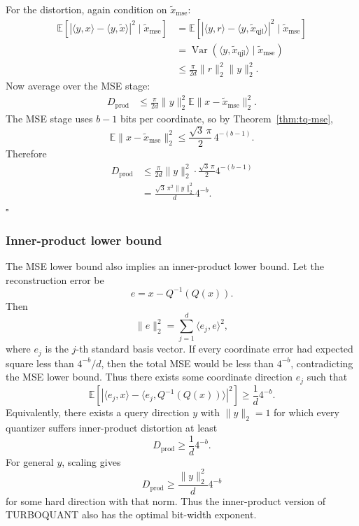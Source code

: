 For the distortion, again condition on $\widetilde x_{\mathrm{mse}}$:
\begin{align}
    \mathbb E\left[|\langle y,x\rangle-\langle y,\widetilde x\rangle|^2
    \mid \widetilde x_{\mathrm{mse}}\right]
    &=\mathbb E\left[|\langle y,r\rangle-\langle y,\widetilde x_{\mathrm{qjl}}\rangle|^2
    \mid \widetilde x_{\mathrm{mse}}\right]\\
    &=\operatorname{Var}(\langle y,\widetilde x_{\mathrm{qjl}}\rangle\mid \widetilde x_{\mathrm{mse}})\\
    &\le \frac{\pi}{2d}\|r\|_2^2\|y\|_2^2.
\end{align}
Now average over the MSE stage:
\begin{align}
    D_{\mathrm{prod}}
    &\le \frac{\pi}{2d}\|y\|_2^2\mathbb E\|x-\widetilde x_{\mathrm{mse}}\|_2^2.
\end{align}
The MSE stage uses $b-1$ bits per coordinate, so by Theorem~\ref{thm:tq-mse},
\begin{equation}
    \mathbb E\|x-\widetilde x_{\mathrm{mse}}\|_2^2
    \le
    \frac{\sqrt3\,\pi}{2}\,4^{-(b-1)}.
\end{equation}
Therefore
\begin{align}
    D_{\mathrm{prod}}
    &\le
    \frac{\pi}{2d}\|y\|_2^2
    \cdot
    \frac{\sqrt3\,\pi}{2}4^{-(b-1)}\\
    &=
    \frac{\sqrt3\,\pi^2\|y\|_2^2}{d}4^{-b}.
\end{align}
\hfill$\square$

\subsubsection*{Inner-product lower bound}

The MSE lower bound also implies an inner-product lower bound.
Let the reconstruction error be
\begin{equation}
    e=x-Q^{-1}(Q(x)).
\end{equation}
Then
\begin{equation}
    \|e\|_2^2
    =\sum_{j=1}^{d}\langle e_j,e\rangle^2,
\end{equation}
where $e_j$ is the $j$-th standard basis vector.
If every coordinate error had expected square less than $4^{-b}/d$, then the total MSE would be less than $4^{-b}$, contradicting the MSE lower bound.
Thus there exists some coordinate direction $e_j$ such that
\begin{equation}
    \mathbb E\left[
    |\langle e_j,x\rangle-\langle e_j,Q^{-1}(Q(x))\rangle|^2
    \right]
    \ge \frac1d4^{-b}.
\end{equation}
Equivalently, there exists a query direction $y$ with $\|y\|_2=1$ for which every quantizer suffers inner-product distortion at least
\begin{equation}
    D_{\mathrm{prod}}\ge \frac1d4^{-b}.
\end{equation}
For general $y$, scaling gives
\begin{equation}
    D_{\mathrm{prod}}\ge \frac{\|y\|_2^2}{d}4^{-b}
\end{equation}
for some hard direction with that norm.
Thus the inner-product version of TURBOQUANT also has the optimal bit-width exponent.

